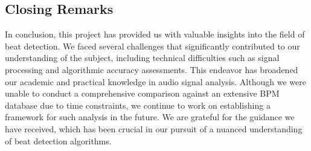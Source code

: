\subsection{Closing Remarks}

In conclusion, this project has provided us with valuable insights into the field of beat detection. We faced several challenges that significantly contributed to our understanding of the subject, including technical difficulties such as signal processing and algorithmic accuracy assessments. This endeavor has broadened our academic and practical knowledge in audio signal analysis. Although we were unable to conduct a comprehensive comparison against an extensive BPM database due to time constraints, we continue to work on establishing a framework for such analysis in the future. We are grateful for the guidance we have received, which has been crucial in our pursuit of a nuanced understanding of beat detection algorithms.
